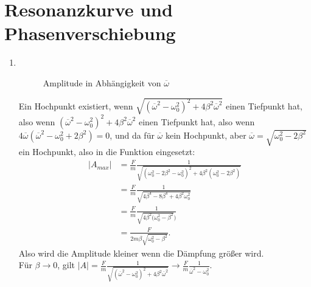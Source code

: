 \documentclass[sectionformat = exercise]{gadsescript}
\begin{document}
\maketitle
\section{Resonanzkurve und Phasenverschiebung}

\begin{enumerate}[label=\alph*)]
	\item ~
		\begin{figure}[H]
			\centering
			\caption{Amplitude in Abhängigkeit von $ \overline{\omega}  $}
			\label{amplitude_in_abhaengigkeit_von_omega}
		\end{figure}
		Ein Hochpunkt existiert, wenn $ \sqrt{(\overline{\omega}^2 - \omega_0^2)^2 + 4\beta^2\overline{\omega}^2 }  $ einen Tiefpunkt hat, also wenn $ (\overline{\omega}^2 - \omega_0^2)^2 + 4\beta^2\overline{\omega}^2 $ einen Tiefpunkt hat, also wenn $ 4\overline{\omega} (\overline{\omega}^2 - \omega_0^2 + 2\beta^2) = 0 $, und da für $ \overline{\omega}  $ kein Hochpunkt, aber $ \overline{\omega} = \sqrt{\omega_0^2 - 2\beta^2}  $ ein Hochpunkt, also in die Funktion eingesetzt:
		\begin{align*}
			|A_{max}| &= \frac{ F }{ m } \frac{ 1 }{ \sqrt{(\omega_0^2 - 2\beta^2 - \omega_0^2)^2 + 4\beta^2(\omega_0^2 - 2\beta^2)} }\\
			~&= \frac{ F }{ m } \frac{ 1 }{ \sqrt{4\beta^4 - 8\beta^4 + 4\beta^2\omega_0^2} }\\
			~&=  \frac{ F }{ m } \frac{ 1 }{ \sqrt{4\beta^2(\omega_0^2 - \beta^2}) }\\
			~&= \frac{ F }{ 2m\beta \sqrt{\omega_0^2 - \beta^2}  } .
		\end{align*}
		Also wird die Amplitude kleiner wenn die Dämpfung größer wird.\\
		Für $ \beta \to 0 $, gilt $ |A| = \frac{ F }{ m } \frac{ 1 }{ \sqrt{(\overline{\omega}^2 - \omega_0^2)^2 + 4\beta^2\overline{\omega}^2 } } \to \frac{ F }{ m } \frac{ 1 }{ \overline{\omega}^2 - \omega_0^2 } $.\\

\end{enumerate}
\end{document}
